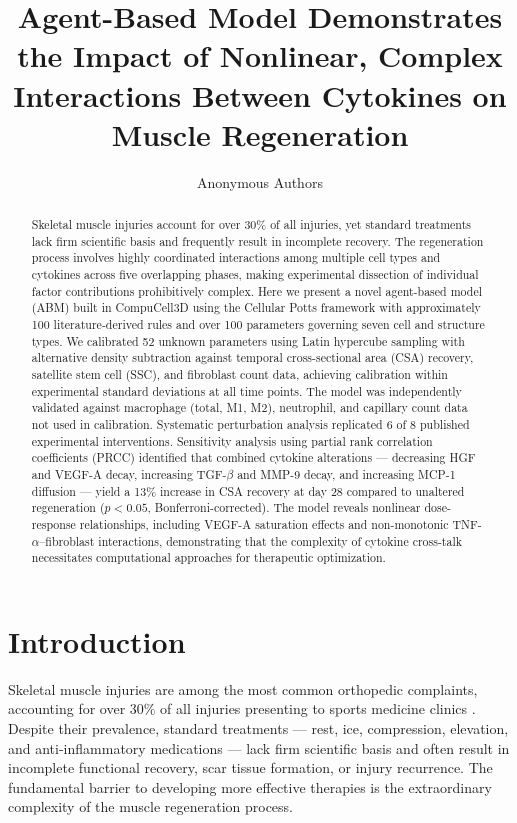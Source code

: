 \documentclass[11pt]{article}
\title{Agent-Based Model Demonstrates the Impact of Nonlinear, Complex Interactions Between Cytokines on Muscle Regeneration}
\author{Anonymous Authors}
\date{}
\begin{document}
\maketitle

\begin{abstract}
Skeletal muscle injuries account for over 30\% of all injuries, yet standard treatments lack firm scientific basis and frequently result in incomplete recovery. The regeneration process involves highly coordinated interactions among multiple cell types and cytokines across five overlapping phases, making experimental dissection of individual factor contributions prohibitively complex. Here we present a novel agent-based model (ABM) built in CompuCell3D using the Cellular Potts framework with approximately 100 literature-derived rules and over 100 parameters governing seven cell and structure types. We calibrated 52 unknown parameters using Latin hypercube sampling with alternative density subtraction against temporal cross-sectional area (CSA) recovery, satellite stem cell (SSC), and fibroblast count data, achieving calibration within experimental standard deviations at all time points. The model was independently validated against macrophage (total, M1, M2), neutrophil, and capillary count data not used in calibration. Systematic perturbation analysis replicated 6 of 8 published experimental interventions. Sensitivity analysis using partial rank correlation coefficients (PRCC) identified that combined cytokine alterations --- decreasing HGF and VEGF-A decay, increasing TGF-$\beta$ and MMP-9 decay, and increasing MCP-1 diffusion --- yield a 13\% increase in CSA recovery at day 28 compared to unaltered regeneration ($p < 0.05$, Bonferroni-corrected). The model reveals nonlinear dose-response relationships, including VEGF-A saturation effects and non-monotonic TNF-$\alpha$--fibroblast interactions, demonstrating that the complexity of cytokine cross-talk necessitates computational approaches for therapeutic optimization.
\end{abstract}

\section{Introduction}

Skeletal muscle injuries are among the most common orthopedic complaints, accounting for over 30\% of all injuries presenting to sports medicine clinics \citep{jarvinen2005muscle}. Despite their prevalence, standard treatments --- rest, ice, compression, elevation, and anti-inflammatory medications --- lack firm scientific basis and often result in incomplete functional recovery, scar tissue formation, or injury recurrence. The fundamental barrier to developing more effective therapies is the extraordinary complexity of the muscle regeneration process.
\end{document}
